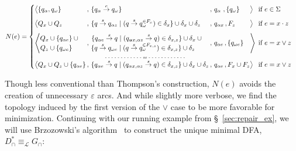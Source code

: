 \documentclass[sigplan,acmsmall,nonacm,screen]{acmart}\settopmatter{printfolios=false,printccs=false,printacmref=false}
\begin{document}
\begin{equation*}
N(e) =
\begin{cases}
  \begin{alignedat}{8}
    &\big\langle \{q_\alpha, q_\omega\}
    &&\,,\, \{ q_\alpha \overset{e}{\rightarrow} q_\omega \}
    &&\,,\, q_\alpha\,\,, \{q_{\omega}\}
    &&\big\rangle
    &&\:\: \text{if } e \in \Sigma \\[0.5em]

    &\big\langle Q_{x} \cup Q_{z}
    &&\,,\, \{ q \overset{s}{\rightarrow} q_{\alpha z} \mid (q \overset{s}{\rightarrow} q_{\omega}^{\in F_x}) \in \delta_x \} \cup \delta_{x} \cup \delta_{z}
    &&\,,\, q_{\alpha x}\,, F_{z}
    &&\big\rangle
    &&\:\: \text{if } e = x \cdot z \\[0.5em]

    &\Bigg\langle   \begin{matrix} Q_{x}\cup \{q_{\alpha e}\}\:\cup\\ Q_{z} \cup \{q_{\omega e}\}\phantom{\:\cup} \end{matrix}
    &&\,,\, \begin{matrix}\{ q_{\alpha e} \overset{s}{\rightarrow} q \mid (q_{\alpha x, \alpha z} \overset{s}{\rightarrow} q)\in \delta_{x, z} \} \cup \delta_{x}\:\cup\\
    \{ q \overset{s}{\rightarrow} q_{\omega e} \mid (q \overset{s}{\rightarrow} q_{\omega}^{\in F_{x,z}})\in \delta_{x, z} \}\cup \delta_{z}\phantom{\,\:\cup}\end{matrix}
    &&\,,\, q_{\alpha e}\,, \{q_{\omega e}\}
    &&\Bigg\rangle
    &&\:\:\text{if } e = x \lor z\hspace{-0.5cm}\\[-0.5em]
    \multicolumn{9}{c}{\tiny{\text{- - - - - - - - - - - - or - - - - - - - - - - - -}}} \\[-0.5em]
    &\big\langle Q_{x} \cup Q_{z} \cup \{q_{\alpha e}\}
    &&\,,\, \{ q_{\alpha e} \overset{s}{\rightarrow} q \mid (q_{\alpha x, \alpha z} \overset{s}{\rightarrow} q) \in \delta_{x, z} \}  \cup \delta_{x} \cup \delta_{z}
    &&\,,\, q_{\alpha e}\,, F_{x} \cup F_{z}
    &&\big\rangle
    &&\:\: \text{if } e = x \lor z
  \end{alignedat}
\end{cases}\vspace{0.2cm}
\end{equation*}

\noindent Though less conventional than Thompson's construction, $N(e)$ avoids the creation of unnecessary $\varepsilon$ arcs. And while slightly more verbose, we find the topology induced by the first version of the $\lor$ case to be more favorable for minimization. Continuing with our running example from \S~\ref{sec:repair_ex}, we will use Brzozowski's algorithm~\cite{brzozowski1962canonical} to construct the unique minimal DFA, $D^*_\cap \equiv_\mathcal{L} G_\cap$: \vspace{-0.4cm}
\end{document}
